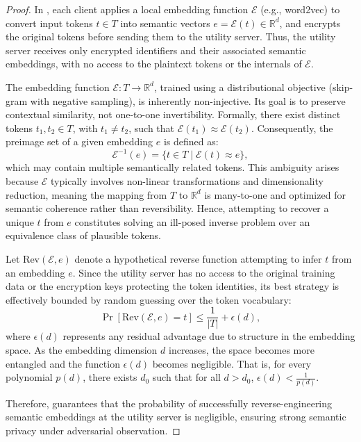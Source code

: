 \begin{proof}
In \Sys, each client applies a local embedding function \(\mathcal{E}\) (e.g., word2vec) to convert input tokens \(t \in T\) into semantic vectors \(e = \mathcal{E}(t) \in \mathbb{R}^d\), and encrypts the original tokens before sending them to the utility server. Thus, the utility server receives only encrypted identifiers and their associated semantic embeddings, with no access to the plaintext tokens or the internals of \(\mathcal{E}\).

The embedding function \(\mathcal{E}: T \to \mathbb{R}^d\), trained using a distributional objective (skip-gram with negative sampling), is inherently non-injective. Its goal is to preserve contextual similarity, not one-to-one invertibility. Formally, there exist distinct tokens \(t_1, t_2 \in T\), with \(t_1 \neq t_2\), such that \(\mathcal{E}(t_1) \approx \mathcal{E}(t_2)\). Consequently, the preimage set of a given embedding \(e\) is defined as:
\[
\mathcal{E}^{-1}(e) = \{t \in T \mid \mathcal{E}(t) \approx e\},
\]
which may contain multiple semantically related tokens. This ambiguity arises because \(\mathcal{E}\) typically involves non-linear transformations and dimensionality reduction, meaning the mapping from \(T\) to \(\mathbb{R}^d\) is many-to-one and optimized for semantic coherence rather than reversibility. Hence, attempting to recover a unique \(t\) from \(e\) constitutes solving an ill-posed inverse problem over an equivalence class of plausible tokens.

Let \(\text{Rev}(\mathcal{E}, e)\) denote a hypothetical reverse function attempting to infer \(t\) from an embedding \(e\). Since the utility server has no access to the original training data or the encryption keys protecting the token identities, its best strategy is effectively bounded by random guessing over the token vocabulary:
\[
\Pr[\text{Rev}(\mathcal{E}, e) = t] \leq \frac{1}{|T|} + \epsilon(d),
\]
where \(\epsilon(d)\) represents any residual advantage due to structure in the embedding space. As the embedding dimension \(d\) increases, the space becomes more entangled and the function \(\epsilon(d)\) becomes negligible. That is, for every polynomial \(p(d)\), there exists \(d_0\) such that for all \(d > d_0\), \(\epsilon(d) < \frac{1}{p(d)}\).

Therefore, \Sys guarantees that the probability of successfully reverse-engineering semantic embeddings at the utility server is negligible, ensuring strong semantic privacy under adversarial observation.
\end{proof}

